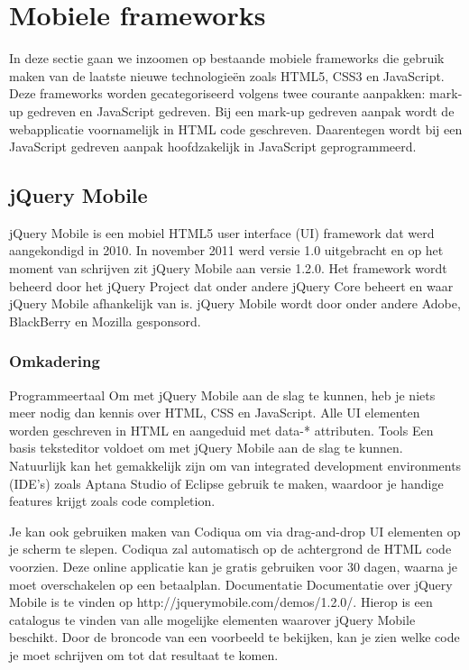 
\section{Mobiele frameworks}
In deze sectie gaan we inzoomen op bestaande mobiele frameworks die gebruik maken van de laatste nieuwe technologieën zoals HTML5, CSS3 en JavaScript. Deze frameworks worden gecategoriseerd volgens twee courante aanpakken: mark-up gedreven en JavaScript gedreven. Bij een mark-up gedreven aanpak wordt de webapplicatie voornamelijk in HTML code geschreven. Daarentegen wordt bij een JavaScript gedreven aanpak hoofdzakelijk in JavaScript geprogrammeerd.

\subsection{jQuery Mobile}
jQuery Mobile is een mobiel HTML5 user interface (UI) framework dat werd aangekondigd in 2010. In november 2011 werd versie 1.0 uitgebracht en op het moment van schrijven zit jQuery Mobile aan versie 1.2.0. Het framework wordt beheerd door het jQuery Project dat onder andere jQuery Core beheert en waar jQuery Mobile afhankelijk van is. jQuery Mobile wordt door onder andere Adobe, BlackBerry en Mozilla gesponsord.

\subsubsection{Omkadering}
Programmeertaal
Om met jQuery Mobile aan de slag te kunnen, heb je niets meer nodig dan kennis over HTML, CSS en JavaScript. Alle UI elementen worden geschreven in HTML en aangeduid met data-* attributen.
Tools
Een basis teksteditor voldoet om met jQuery Mobile aan de slag te kunnen. Natuurlijk kan het gemakkelijk zijn om van integrated development environments (IDE's) zoals Aptana Studio of Eclipse gebruik te maken, waardoor je handige features krijgt zoals code completion.

Je kan ook gebruiken maken van Codiqua om via drag-and-drop UI elementen op je scherm te slepen. Codiqua zal automatisch op de achtergrond de HTML code voorzien. Deze online applicatie kan je gratis gebruiken voor 30 dagen, waarna je moet overschakelen op een betaalplan.
Documentatie
Documentatie over jQuery Mobile is te vinden op http://jquerymobile.com/demos/1.2.0/. Hierop is een catalogus te vinden van alle mogelijke elementen waarover jQuery Mobile beschikt. Door de broncode van een voorbeeld te bekijken, kan je zien welke code je moet schrijven om tot dat resultaat te komen.

